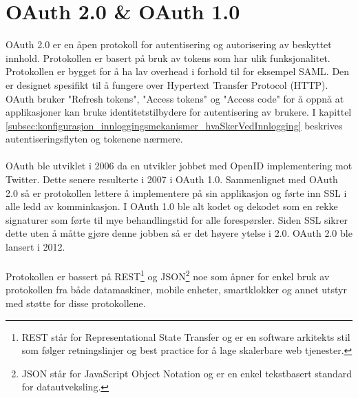 \section{OAuth 2.0 \& OAuth 1.0}
\label{sec:teoridel_oauth}
OAuth 2.0 er en åpen protokoll for autentisering og autorisering av beskyttet innhold. Protokollen er basert på bruk av tokens som har ulik funksjonalitet. Protokollen er bygget for å ha lav overhead i forhold til for eksempel SAML. Den er designet spesifikt til å fungere over Hypertext Transfer Protocol (HTTP). OAuth bruker "Refresh tokens", "Access tokens" og "Access code" for å oppnå at applikasjoner kan bruke identitetstilbydere for autentisering av brukere. I kapittel \ref{subsec:konfigurasjon_innloggingsmekanismer_hvaSkerVedInnlogging} beskrives autentiseringsflyten og tokenene nærmere. \\
\\
OAuth ble utviklet i 2006 da en utvikler jobbet med OpenID implementering mot Twitter. Dette senere resulterte i 2007 i OAuth 1.0.\cite{OAuth10Hist} Sammenlignet med OAuth 2.0 så er protokollen lettere å implementere på sin applikasjon og førte inn SSL i alle ledd av komminkasjon. I OAuth 1.0 ble alt kodet og dekodet som en rekke signaturer som førte til mye behandlingstid for alle forespørsler. Siden SSL sikrer dette uten å måtte gjøre denne jobben så er det høyere ytelse i 2.0.\cite{OAuthDifferences} OAuth 2.0 ble lansert i 2012.  \\
\\
Protokollen er bassert på REST\footnote{REST står for Representational State Transfer og er en software arkitekts stil som følger retningslinjer og best practice for å lage skalerbare web tjenester.} og JSON\footnote{JSON står for JavaScript Object Notation og er en enkel tekstbasert standard for datautveksling.} noe som åpner for enkel bruk av protokollen fra både datamaskiner, mobile enheter, smartklokker og annet utstyr med støtte for disse protokollene.

